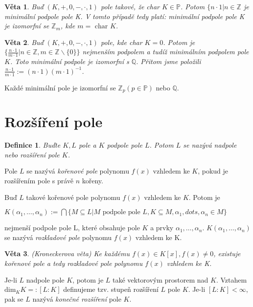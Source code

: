 \documentclass[a4paper, 11pt]{report}
\newtheorem{mydef}{Definice}[chapter]
\newtheorem{veta}{Věta}[chapter]
\begin{document}
\begin{veta}
Buď $(K, +, 0, -, \cdot, 1)$ pole takové, že char $K \in \mathbb{P}$. Potom $\{n \cdot 1 | n \in \mathbb{Z}$ je minimální podpole pole K. V tomto případě tedy platí: minimální podpole pole K je izomorfní se $\mathbb{Z}_m$, kde $m = \text{ char } K$.
\end{veta}

\begin{veta}
Buď $(K, +, 0, -, \cdot, 1)$ pole, kde char $K = 0$. Potom je $\{ \frac{n \cdot 1}{m \cdot 1} | n \in \mathbb{Z}, m \in \mathbb{Z} \backslash \{0\}\}$ nejmenším podpolem  a tudíž minimálním podpolem pole $K$. Toto minimální podpole je izomorfní s $\mathbb{Q}$. Přitom jsme položili $\frac{n \cdot 1}{m \cdot 1} := (n \cdot 1)(m \cdot 1)^{-1}$.
\end{veta}

Každé minimální pole je izomorfní se $\mathbb{Z}_p (p \in \mathbb{P})$ nebo $\mathbb{Q}$.

\section{Rozšíření pole}
\begin{mydef}
Buďte $K, L$ pole a $K$ podpole pole $L$. Potom $L$ se nazývá nadpole nebo rozšíření pole $K$.
\end{mydef}

Pole $L$ se nazývá \emph{kořenové pole} polynomu $f(x)$ vzhledem ke $K$, pokud je rozšířením pole s právě $n$ kořeny.

Buď $L$ takové kořenové pole polynomu $f(x)$ vzhledem ke $K$. Potom je

$K(\alpha_1, \dots, \alpha_n) := \bigcap \{M \subseteq L | M \text{ podpole pole } L, K \subseteq M, \alpha_1, dots, \alpha_n \in M \}$

nejmenší podpole pole L, které obsahuje pole $K$ a prvky $\alpha_1, \dots, \alpha_n$. $K(\alpha_1, \dots, \alpha_n)$ se nazývá \emph{rozkladové pole} polynomu $f(x)$ vzhledem ke K.

\begin{veta}
(Kroneckerova věta) Ke každému $f(x) \in K[x], f(x) \not= 0$, existuje kořenové pole a tedy rozkladové pole polynomu $f(x)$ vzhledem ke K.
\end{veta}

Je-li $L$ nadpole pole $K$, potom je $L$ také vektorovým prostorem nad $K$. Vztahem $\text{dim}_K K =: [L : K]$ definujeme tzv. stupeň rozšíření $L$ pole $K$. Je-li $[L : K] < \infty$, pak se $L$ nazývá \emph{konečné rozšíření} pole $K$.
\end{document}

